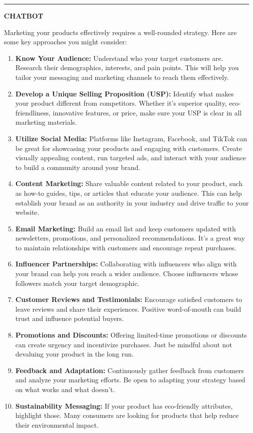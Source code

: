 \documentclass[
  11pt,
  oneside]{article}
\begin{document}
\begin{center}\rule{0.5\linewidth}{0.5pt}\end{center}

\textbf{CHATBOT}

Marketing your products effectively requires a well-rounded strategy.
Here are some key approaches you might consider:

\begin{enumerate}
\def\labelenumi{\arabic{enumi}.}
\item
  \textbf{Know Your Audience:} Understand who your target customers are.
  Research their demographics, interests, and pain points. This will
  help you tailor your messaging and marketing channels to reach them
  effectively.
\item
  \textbf{Develop a Unique Selling Proposition (USP):} Identify what
  makes your product different from competitors. Whether it's superior
  quality, eco-friendliness, innovative features, or price, make sure
  your USP is clear in all marketing materials.
\item
  \textbf{Utilize Social Media:} Platforms like Instagram, Facebook, and
  TikTok can be great for showcasing your products and engaging with
  customers. Create visually appealing content, run targeted ads, and
  interact with your audience to build a community around your brand.
\item
  \textbf{Content Marketing:} Share valuable content related to your
  product, such as how-to guides, tips, or articles that educate your
  audience. This can help establish your brand as an authority in your
  industry and drive traffic to your website.
\item
  \textbf{Email Marketing:} Build an email list and keep customers
  updated with newsletters, promotions, and personalized
  recommendations. It's a great way to maintain relationships with
  customers and encourage repeat purchases.
\item
  \textbf{Influencer Partnerships:} Collaborating with influencers who
  align with your brand can help you reach a wider audience. Choose
  influencers whose followers match your target demographic.
\item
  \textbf{Customer Reviews and Testimonials:} Encourage satisfied
  customers to leave reviews and share their experiences. Positive
  word-of-mouth can build trust and influence potential buyers.
\item
  \textbf{Promotions and Discounts:} Offering limited-time promotions or
  discounts can create urgency and incentivize purchases. Just be
  mindful about not devaluing your product in the long run.
\item
  \textbf{Feedback and Adaptation:} Continuously gather feedback from
  customers and analyze your marketing efforts. Be open to adapting your
  strategy based on what works and what doesn't.
\item
  \textbf{Sustainability Messaging:} If your product has eco-friendly
  attributes, highlight those. Many consumers are looking for products
  that help reduce their environmental impact.
\end{enumerate}
\end{document}
